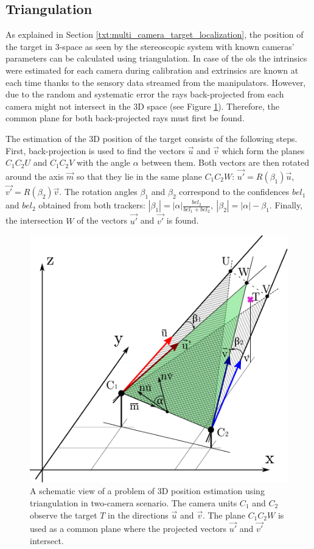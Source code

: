\subsection{Triangulation} \label{txt:triangulation}

As explained in Section \ref{txt:multi_camera_target_localization}, the position of the target in 3-space as seen by the stereoscopic system with known cameras' parameters can be calculated using triangulation. In case of the \gls{ols} the intrinsics were estimated for each camera during calibration and extrinsics are known at each time thanks to the sensory data streamed from the manipulators. However, due to the random and systematic error the rays back-projected from each camera might not intersect in the 3D space (see Figure \ref{fig:triangulationSchematicView}). Therefore, the common plane for both back-projected rays must first be found.

The estimation of the 3D position of the target consists of the following steps. First, back-projection is used to find the vectors $\vec{u}$ and $\vec{v}$ which form the planes $C_{1}C_{2}U$ and $C_{1}C_{2}V$ with the angle $\alpha$ between them. Both vectors are then rotated around the axis $\vec{m}$ so that they lie in the same plane $C_{1}C_{2}W$: $\vec{u'} = R(\beta_{1})\vec{u}$, $\vec{v'} = R(\beta_{2})\vec{v}$. The rotation angles $\beta_{1}$ and $\beta_{2}$ correspond to the confidences $bel_{1}$ and $bel_{2}$ obtained from both trackers: $|\beta_{1}| = |\alpha|\frac{bel_{2}}{bel_{1} + bel_{2}},~|\beta_{2}| = |\alpha| -\beta_{1}$. Finally, the intersection $W$ of the vectors $\vec{u'}$ and $\vec{v'}$ is found.

\begin{figure}[htb]\centering
	\centering
	\includegraphics[width=0.45\linewidth]{fig/triangulation.pdf}
	\caption{A schematic view of a problem of 3D position estimation using triangulation in two-camera scenario. The camera units $C_{1}$ and $C_{2}$ observe the target $T$ in the directions $\vec{u}$ and $\vec{v}$. The plane $C_{1}C_{2}W$ is used as a common plane where the projected vectors $\vec{u'}$ and $\vec{v'}$ intersect.}
	\label{fig:triangulationSchematicView}
\end{figure}

